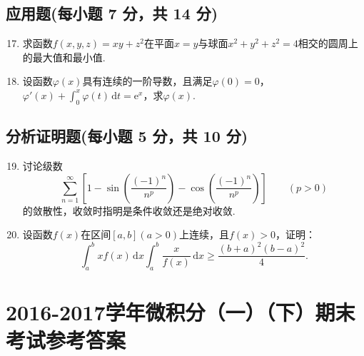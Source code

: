\documentclass[../main.tex]{subfiles}
\begin{document}
\section{应用题(每小题 7 分，共 14 分)}
\begin{enumerate}
    \setcounter{enumi}{16}
    \item 求函数$f(x,y,z)=xy+z^{2}$在平面$x=y$与球面$x^{2}+y^{2}+z^{2}=4$相交的圆周上的最大值和最小值.
          \vspace{10em}

    \item 设函数$\varphi(x)$具有连续的一阶导数，且满足$\varphi(0)=0$，$\varphi'(x)+\int_{0}^{x}\varphi(t)\,\mathrm{d}t=\mathrm{e}^{x}$，求$\varphi(x)$.
          \vspace{10em}
\end{enumerate}

\section{分析证明题(每小题 5 分，共 10 分)}
\begin{enumerate}
    \setcounter{enumi}{18}
    \item 讨论级数
          \[
              \sum_{n=1}^{\infty}\left[1-\sin\left(\frac{(-1)^{n}}{n^{p}}\right)-\cos\left(\frac{(-1)^{n}}{n^{p}}\right)\right]\qquad (p>0)
          \]
          的敛散性，收敛时指明是条件收敛还是绝对收敛.
          \vspace{10em}

    \item 设函数$f(x)$在区间$[a,b](a>0)$上连续，且$f(x)>0$，证明：
          \[
              \int_{a}^{b}xf(x)\,\mathrm{d}x\int_{a}^{b}\frac{x}{f(x)}\,\mathrm{d}x\geq\frac{(b+a)^2(b-a)^2}{4}.
          \]
          \vspace{10em}
\end{enumerate}

\chapter{2016-2017学年微积分（一）（下）期末考试参考答案}
\end{document}
